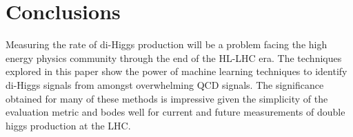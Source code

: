 \section{Conclusions}
\label{sec:conclusions}
Measuring the rate of di-Higgs production will be a problem facing the high energy physics community through the end of the HL-LHC era. The techniques explored in this paper show the power of machine learning techniques to identify di-Higgs signals from amongst overwhelming QCD signals. The significance obtained for many of these methods is impressive given the simplicity of the evaluation metric and bodes well for current and future measurements of double higgs production at the LHC.

